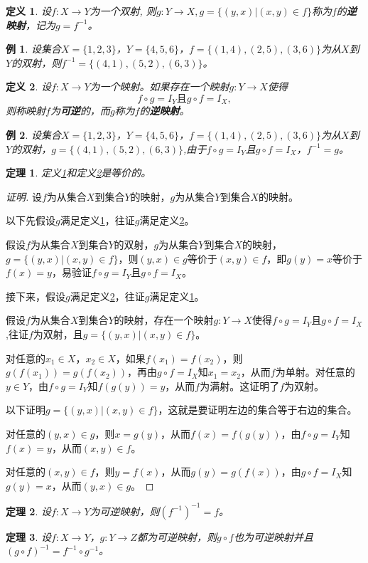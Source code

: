 \documentclass{book}[oneside]
\newtheorem{Def}{定义}[chapter]
\newtheorem{Thm}{定理}[chapter]
\newtheorem*{Example}{例}
\begin{document}
\begin{CJK*}{UTF8}{gbsn}
   \begin{Def}\label{inverse1}
          设$f:X\to Y$为一个双射, 则$g:Y\to X, g=\{(y,x)|(x,y)\in f\}$称为$f$的{\bfseries 逆映射}，记为$g=f^{-1}$。
   \end{Def}
   \begin{Example}
     设集合$X=\{1,2,3\}$，$Y=\{4,5,6\}$，$f=\{(1,4),(2,5),(3,6)\}$为从$X$到$Y$的双射，则$f^{-1}=\{(4,1),(5,2),(6,3)\}$。
   \end{Example}
    \begin{Def}\label{inverse2}
     设$f:X\to Y$为一个映射。如果存在一个映射$g:Y\to X$使得\[f\circ g = I_{Y} \text{且} g\circ f = I_{X},\]则称映射$f$为{\bfseries 可逆}的，而$g$称为$f$的{\bfseries 逆映射}。
   \end{Def}
      \begin{Example}
     设集合$X=\{1,2,3\}$，$Y=\{4,5,6\}$，$f=\{(1,4),(2,5),(3,6)\}$为从$X$到$Y$的双射，$g=\{(4,1),(5,2),(6,3)\}$,由于$f\circ g = I_{Y}$且$ g\circ f = I_{X}$，$f^{-1}=g$。
   \end{Example}
\begin{Thm}
   定义\ref{inverse1}和定义\ref{inverse2}是等价的。
 \end{Thm}
 \begin{proof}[证明]
   设$f$为从集合$X$到集合$Y$的映射，$g$为从集合$Y$到集合$X$的映射。

   以下先假设$g$满足定义\ref{inverse1}，往证$g$满足定义\ref{inverse2}。

   假设$f$为从集合$X$到集合$Y$的双射，$g$为从集合$Y$到集合$X$的映射，$g=\{(y,x)|(x,y)\in f\}$，则$(y,x)\in g$等价于$(x,y)\in f$，即$g(y)=x$等价于$f(x)=y$，易验证$f\circ g = I_{Y}$且$g\circ f = I_{X}$。

   接下来，假设$g$满足定义\ref{inverse2}，往证$g$满足定义\ref{inverse1}。

   假设$f$为从集合$X$到集合$Y$的映射，存在一个映射$g:Y\to X$使得$f\circ g = I_{Y}$且$g\circ f = I_{X}$,往证$f$为双射，且$g=\{(y,x)|(x,y)\in f\}$。

   对任意的$x_1\in X$，$x_2\in X$，如果$f(x_1)=f(x_2)$，则$g(f(x_1))=g(f(x_2))$，再由$g\circ f = I_{X}$知$x_1=x_2$，从而$f$为单射。对任意的$y\in Y$，由$f\circ g = I_{Y}$知$f(g(y))=y$，从而$f$为满射。这证明了$f$为双射。

   以下证明$g=\{(y,x)|(x,y)\in f\}$，这就是要证明左边的集合等于右边的集合。

   对任意的$(y,x)\in g$，则$x=g(y)$，从而$f(x)=f(g(y))$，由$f\circ g = I_{Y}$知$f(x)=y$，从而$(x,y)\in f$。

   对任意的$(x,y)\in f$，则$y=f(x)$，从而$g(y)=g(f(x))$，由$g\circ f = I_{X}$知$g(y)=x$，从而$(y,x) \in g$。
 \end{proof}
 \begin{Thm}
    设$f:X\to Y$为可逆映射，则$(f^{-1})^{-1}=f$。
  \end{Thm}
  \begin{Thm}
    设$f:X\to Y$，$g:Y\to Z$都为可逆映射，则$g\circ f$也为可逆映射并且$(g\circ f)^{-1} = f^{-1}\circ g^{-1}$。
  \end{Thm}


\end{CJK*}
\end{document}
